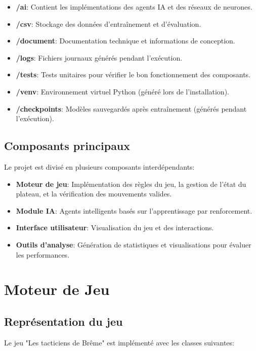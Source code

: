 \documentclass[]{article}
\begin{document}
\begin{itemize}
  \item \textbf{/ai}: Contient les implémentations des agents IA et des réseaux de neurones.
  \item \textbf{/csv}: Stockage des données d'entraînement et d'évaluation.
  \item \textbf{/document}: Documentation technique et informations de conception.
  \item \textbf{/logs}: Fichiers journaux générés pendant l'exécution.
  \item \textbf{/tests}: Tests unitaires pour vérifier le bon fonctionnement des composants.
  \item \textbf{/venv}: Environnement virtuel Python (généré lors de l'installation).
  \item \textbf{/checkpoints}: Modèles sauvegardés après entraînement (générés pendant l'exécution).
\end{itemize}

\subsection{Composants principaux}
Le projet est divisé en plusieurs composants interdépendants:

\begin{itemize}
  \item \textbf{Moteur de jeu}: Implémentation des règles du jeu, la gestion de l'état du plateau, et la vérification des mouvements valides.
  \item \textbf{Module IA}: Agents intelligents basés sur l'apprentissage par renforcement.
  \item \textbf{Interface utilisateur}: Visualisation du jeu et des interactions.
  \item \textbf{Outils d'analyse}: Génération de statistiques et visualisations pour évaluer les performances.
\end{itemize}

\section{Moteur de Jeu}

\subsection{Représentation du jeu}
Le jeu "Les tacticiens de Brême" est implémenté avec les classes suivantes:
\end{document}

